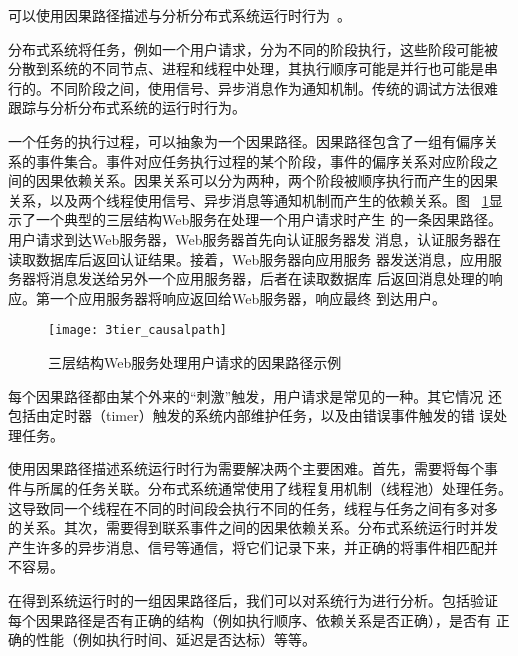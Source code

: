 

可以使用因果路径描述与分析分布式系统运行时行为~\cite{pinpoint, magpie,
pip, x-trace, project5}。

分布式系统将任务，例如一个用户请求，分为不同的阶段执行，这些阶段可能被
分散到系统的不同节点、进程和线程中处理，其执行顺序可能是并行也可能是串
行的。不同阶段之间，使用信号、异步消息作为通知机制。传统的调试方法很难
跟踪与分析分布式系统的运行时行为。

一个任务的执行过程，可以抽象为一个因果路径。因果路径包含了一组有偏序关
系的事件集合。事件对应任务执行过程的某个阶段，事件的偏序关系对应阶段之
间的因果依赖关系。因果关系可以分为两种，两个阶段被顺序执行而产生的因果
关系，以及两个线程使用信号、异步消息等通知机制而产生的依赖关系。图~
\ref{fig:3tier}显示了一个典型的三层结构Web服务在处理一个用户请求时产生
的一条因果路径。用户请求到达Web服务器，Web服务器首先向认证服务器发
消息，认证服务器在读取数据库后返回认证结果。接着，Web服务器向应用服务
器发送消息，应用服务器将消息发送给另外一个应用服务器，后者在读取数据库
后返回消息处理的响应。第一个应用服务器将响应返回给Web服务器，响应最终
到达用户。

\begin{figure}
\centering
\texttt{[image: 3tier\_causalpath]}
\caption{三层结构Web服务处理用户请求的因果路径示例}
\label{fig:3tier}
\end{figure}

每个因果路径都由某个外来的“刺激”触发，用户请求是常见的一种。其它情况
还包括由定时器（timer）触发的系统内部维护任务，以及由错误事件触发的错
误处理任务。

使用因果路径描述系统运行时行为需要解决两个主要困难。首先，需要将每个事
件与所属的任务关联。分布式系统通常使用了线程复用机制（线程池）处理任务。
这导致同一个线程在不同的时间段会执行不同的任务，线程与任务之间有多对多
的关系。其次，需要得到联系事件之间的因果依赖关系。分布式系统运行时并发
产生许多的异步消息、信号等通信，将它们记录下来，并正确的将事件相匹配并
不容易。

在得到系统运行时的一组因果路径后，我们可以对系统行为进行分析。包括验证
每个因果路径是否有正确的结构（例如执行顺序、依赖关系是否正确），是否有
正确的性能（例如执行时间、延迟是否达标）等等。

% 


